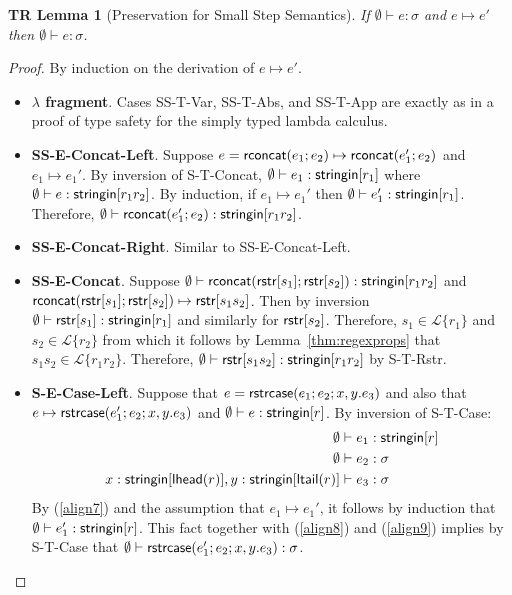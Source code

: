 \documentclass[12pt]{article}
\newcommand{\todo}[1]{{\color{red} #1}}
\newtheorem{trlem}[tr]{TR Lemma}
\theoremstyle{definition}
\newcommand{\Lagr}{\mathcal{L}}
\newcommand{\lang}[1]{\Lagr\{#1\}}
\newcommand{\stringin}[1]{{\sf stringin}[#1]}
\newcommand{\strcase}[3]{ {\sf rstrcase}(#1; #2; #3)}
\newcommand{\lhead}[1]{ {\sf lhead}(#1) }
\newcommand{\ltail}[1]{ {\sf ltail}(#1) }
\begin{document}
\begin{trlem}[Preservation for Small Step Semantics]
If $\emptyset \vdash e : \sigma$ and $e \mapsto e'$ then $\emptyset \vdash e : \sigma$.
\end{trlem}
\begin{proof}

By induction on the derivation of $e \mapsto e'$.

\begin{itemize}[label=$ $,itemsep=1ex]
\item \textbf{$\lambda$ fragment}. Cases SS-T-Var, SS-T-Abs, and SS-T-App are exactly as in a proof of type safety for
the simply typed lambda calculus.

\item \textbf{SS-E-Concat-Left}.
Suppose $e = {\sf rconcat}(e_1;e_2) \mapsto {\sf rconcat}(e_1';e_2)$ and $e_1 \mapsto e_1'$.
By inversion of S-T-Concat, $\emptyset\vdash e_1 : \stringin{r_1}$ where \\$\emptyset\vdash e : \stringin{r_1r_2}$.
By induction, if $e_1 \mapsto e_1'$ then $\emptyset\vdash e_1' : \stringin{r_1}$.
Therefore, $\emptyset\vdash \rconcat{e_1'}{e_2} : \stringin{r_1r_2}$.

\item {\textbf{SS-E-Concat-Right}}. \todo{Similar to SS-E-Concat-Left.}

\item \textbf{SS-E-Concat}. Suppose $\emptyset\vdash\rconcat{\rstr{s_1}}{\rstr{s_2}} : \stringin{r_1r_2}$ and
${\sf rconcat}({\sf rstr}[s_1];{\sf rstr}[s_2]) \mapsto {\sf rstr}[s_1s_2]$.
Then by inversion $\emptyset\vdash\rstr{s_1} : \stringin{r_1}$ and similarly for ${\sf rstr}[s_2]$.
Therefore, $s_1 \in \lang{r_1}$ and\\ $s_2 \in  \lang{r_2}$ from which it follows by Lemma~\ref{thm:regexprops}
that $s_1s_2 \in \lang{r_1r_2}$. Therefore, $\emptyset\vdash \rstr{s_1s_2} : \stringin{r_1r_2}$ by S-T-Rstr.

\item \textbf{S-E-Case-Left}.
Suppose that $e = \strcase{e_1}{e_2}{x,y.e_3}$ and also that
$e \mapsto \strcase{e_1'}{e_2}{x,y.e_3}$
and $\emptyset \vdash e : \stringin{r}$.
By inversion of S-T-Case:
\begin{align}
\emptyset&\vdash e_1 : \stringin{r} \label{align7} \\
\emptyset&\vdash e_2 : \sigma \label{align8} \\ 
x:\stringin{\lhead{r}}, y : \stringin{\ltail{r}} &\vdash e_3 : \sigma \label{align9}
\end{align}
By (\ref{align7}) and the assumption that $e_1 \mapsto e_1'$, it follows by induction that $\emptyset\vdash e_1' : \stringin{r}$.
This fact together with (\ref{align8}) and (\ref{align9}) implies by S-T-Case that
$\emptyset\vdash\strcase{e_1'}{e_2}{x,y.e_3} : \sigma$.


\end{itemize}
\end{proof}
\end{document}
